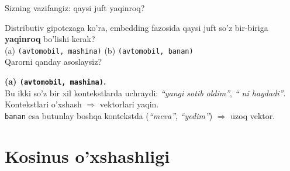 \documentclass[aspectratio=169,11pt]{beamer}
\begin{document}
\begin{frame}{Sizning vazifangiz: qaysi juft yaqinroq?}
  \begin{tcolorbox}[warnbox,title=Savol --- 60 soniya]
    \small
    Distributiv gipotezaga ko'ra, embedding fazosida qaysi juft so'z
    bir-biriga \textbf{yaqinroq} bo'lishi kerak?\\[5pt]
    (a) \texttt{(avtomobil, mashina)} \qquad
    (b) \texttt{(avtomobil, banan)}\\[4pt]
    \footnotesize Qarorni qanday asoslaysiz?
  \end{tcolorbox}
  \pause
  \begin{tcolorbox}[okbox,title=Javob]
    \small
    \textbf{(a) \texttt{(avtomobil, mashina)}.}\\[3pt]
    Bu ikki so'z bir xil kontekstlarda uchraydi:
    \textit{``yangi \underline{\hspace{0.7cm}} sotib oldim''}, \textit{``\underline{\hspace{0.7cm}} ni haydadi''}.
    Kontekstlari o'xshash $\Rightarrow$ vektorlari yaqin.\\[3pt]
    \texttt{banan} esa butunlay boshqa kontekstda
    (\textit{``meva''}, \textit{``yedim''}) $\Rightarrow$ uzoq vektor.
  \end{tcolorbox}
\end{frame}

\section[Kosinus]{Kosinus o'xshashligi}
\end{document}
